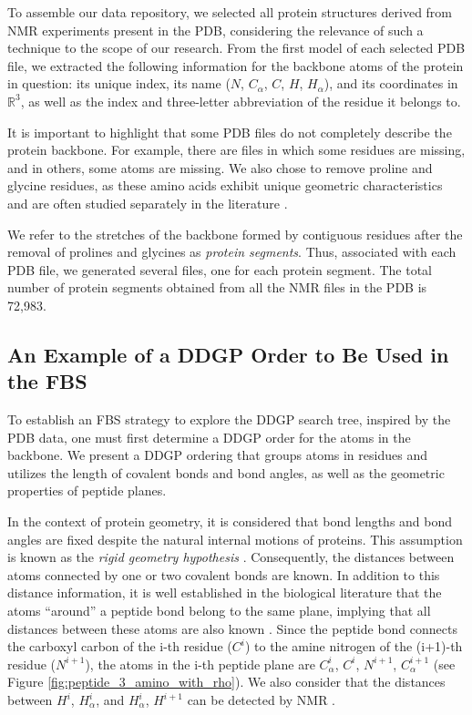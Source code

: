 \documentclass[journal=jacsat,manuscript=article]{achemso}
\begin{document}
To assemble our data repository, we selected all protein structures derived from NMR experiments present in the PDB, considering the relevance of such a technique to the scope of our research. From {the first model of} each selected PDB file, we extracted the following information for the backbone atoms of the protein in question: its unique index, its name ($N$, $C_\alpha$, $C$, $H$, $H_\alpha$), and its coordinates in $\mathbb{R}^{3}$, as well as the index and three-letter abbreviation of the residue it belongs to.

It is important to highlight that some PDB files do not completely describe the protein backbone. For example, there are files in which some residues are missing, and in others, some atoms are missing. We also chose to remove proline and glycine residues, as these amino acids exhibit unique geometric characteristics and are often studied separately in the literature \cite{lovell2012structValidationCalpha,morris1992stereochemical,
read2011new}.

We refer to the stretches of the backbone formed by contiguous residues after the removal of prolines and glycines as \emph{protein segments}. Thus, associated with each PDB file, we generated several files, one for each protein segment. The total number of protein segments obtained from all the NMR files in the PDB is 72,983.

\subsection{An Example of a DDGP Order to Be Used in the FBS}

To establish an FBS strategy to explore the DDGP search tree, inspired by the PDB data, one must first determine a DDGP order for the atoms in the backbone. We present a DDGP ordering that groups atoms in residues {and} utilizes the length of covalent bonds and bond angles, as well as the geometric properties of peptide planes.

In the context of protein geometry, it is considered that bond lengths and bond angles {are fixed despite the natural} internal motions of proteins. This assumption is known as the \emph{rigid geometry hypothesis} \cite{gibson1997energyMinRigid}. Consequently, the distances between atoms connected by one or two covalent bonds are known. In addition to this distance information, it is well established in the biological literature that the atoms ``around'' a peptide bond belong to the same plane, implying that all distances between these atoms are also known \cite{lavor2019minNMRrigidity}. Since the peptide bond connects the carboxyl carbon of the i-th residue ($C^{i}$) to the amine nitrogen of the (i+1)-th residue ($N^{i+1}$), the atoms in the i-th peptide plane are $C_{\alpha}^{i}$, $C^{i}$, $N^{i+1}$, $C_{\alpha}^{i+1}$ (see Figure \ref{fig:peptide_3_amino_with_rho}). We also consider that the distances between $H^{i}$, $H_{\alpha}^{i}${,} and $H_{\alpha}^{i}$, $H^{i+1}$ can be detected by NMR \cite{guntert1998structBioNMRdata,rowland1996intermolecularContact,billeter1982sequentialhNMRspectra}.
\end{document}
